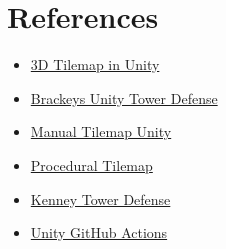 \documentclass{article}
\begin{document}
\section{References}

\begin{itemize}
    \item \href{https://youtu.be/ulFc6p3hQzQ}{3D Tilemap in Unity}
    \item \href{https://www.youtube.com/playlist?list=PLPV2KyIb3jR4u5jX8za5iU1cqnQPmbzG0}{Brackeys Unity Tower Defense}
    \item \href{https://forum.unity.com/threads/how-can-i-place-a-tile-in-a-tilemap-by-script.508338/}{Manual Tilemap Unity}
    \item \href{https://blog.unity.com/technology/procedural-patterns-you-can-use-with-tilemaps-part-i}{Procedural Tilemap}
    \item \href{https://www.kenney.nl/assets/tower-defense-kit}{Kenney Tower Defense}
    \item \href{https://isaacbroyles.com/gamedev/2020/07/04/unity-github-actions.html}{Unity GitHub Actions}
\end{itemize}
\end{document}
